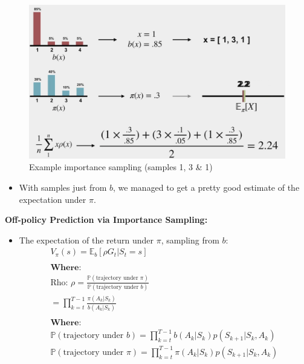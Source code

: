 \documentclass[12pt, a4paper]{article}
\begin{document}
\begin{itemize}
\begin{itemize}
    \begin{figure}[H]
      \centering  %
        \includegraphics[width=0.7\columnwidth]{images/importance-sampling-eg.png}
        \caption{Example importance sampling (samples 1, 3 \& 1)}
        \label{fig:importance-sampling-eg}
    \end{figure}
    \begin{itemize}
      \item With samples just from $b$, we managed to get a pretty good estimate of the expectation under $\pi$.
    \end{itemize}
  \end{itemize}
\end{itemize}


\textbf{Off-policy Prediction via Importance Sampling:}
\begin{itemize}
  \item The expectation of the return under $\pi$, sampling from $b$:
  \begin{gather*}
  V_\pi(s) = \mathbb{E}_b [\rho G_t | S_t = s] \\ \\
  \textbf{Where:} \\
  \text{Rho: } \rho = \frac{\mathbb{P}(\text{trajectory under $\pi$})}{\mathbb{P}(\text{trajectory under $b$})} \\
  = \prod_{k=t}^{T-1} \frac{\pi(A_k | S_k)}{b(A_k | S_k)} \\ \\
  \textbf{Where:} \\
  \mathbb{P}(\text{trajectory under $b$}) = \prod_{k=t}^{T-1} b(A_k | S_k) p(S_{k+1} | S_k, A_k) \\
  \mathbb{P}(\text{trajectory under $\pi$}) = \prod_{k=t}^{T-1} \pi(A_k | S_k) p(S_{k+1} | S_k, A_k) \\
\end{gather*}
\end{itemize}
\end{document}
